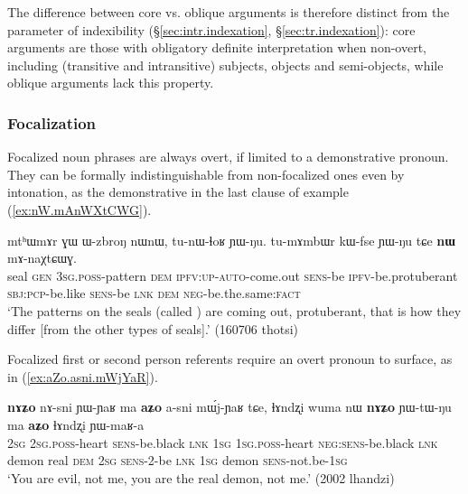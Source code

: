 The difference between core vs. oblique arguments is therefore distinct from the parameter of indexibility (§\ref{sec:intr.indexation}, §\ref{sec:tr.indexation}): core arguments are those with obligatory definite interpretation when non-overt, including (transitive and intransitive) subjects, objects and semi-objects, while oblique arguments lack this property.

\subsubsection{Focalization} \label{sec:focalization.overt}
Focalized noun phrases are always overt, if limited to a demonstrative pronoun. They can be formally indistinguishable from non-focalized ones even by intonation, as the demonstrative  in the last clause of example (\ref{ex:nW.mAnWXtCWG}).

\begin{exe}
\ex \label{ex:nW.mAnWXtCWG}
\gll mtʰɯmɤr ɣɯ ɯ-zbroŋ nɯnɯ, tu-nɯ-ɬoʁ ɲɯ-ŋu.  tu-mɤmbɯr kɯ-fse ɲɯ-ŋu tɕe \textbf{nɯ} mɤ-naχtɕɯɣ. \\
seal \textsc{gen} \textsc{3sg}.\textsc{poss}-pattern \textsc{dem} \textsc{ipfv}:\textsc{up}-\textsc{auto}-come.out \textsc{sens}-be \textsc{ipfv}-be.protuberant \textsc{sbj}:\textsc{pcp}-be.like \textsc{sens}-be \textsc{lnk} \textsc{dem} \textsc{neg}-be.the.same:\textsc{fact} \\
\glt `The patterns on the seals (called ) are coming out, protuberant, that is how they differ [from the other types of seals].' (160706 thotsi)
\end{exe}

Focalized first or second person referents require an overt pronoun to surface, as in (\ref{ex:aZo.asni.mWjYaR}).
\largerpage
\begin{exe}
\ex \label{ex:aZo.asni.mWjYaR}
\gll \textbf{nɤʑo} nɤ-sni ɲɯ-ɲaʁ ma \textbf{aʑo} a-sni mɯ́j-ɲaʁ tɕe, ɬɤndʐi wuma nɯ \textbf{nɤʑo} ɲɯ-tɯ-ŋu ma \textbf{aʑo} ɬɤndʐi ɲɯ-maʁ-a \\
\textsc{2sg} \textsc{2sg}.\textsc{poss}-heart \textsc{sens}-be.black \textsc{lnk} \textsc{1sg} \textsc{1sg}.\textsc{poss}-heart  \textsc{neg}:\textsc{sens}-be.black \textsc{lnk} demon real \textsc{dem} \textsc{2sg} \textsc{sens}-2-be \textsc{lnk} \textsc{1sg} demon \textsc{sens}-not.be-\textsc{1sg} \\
\glt `You are evil, not me, you are the real demon, not me.' (2002 lhandzi)
\end{exe}

